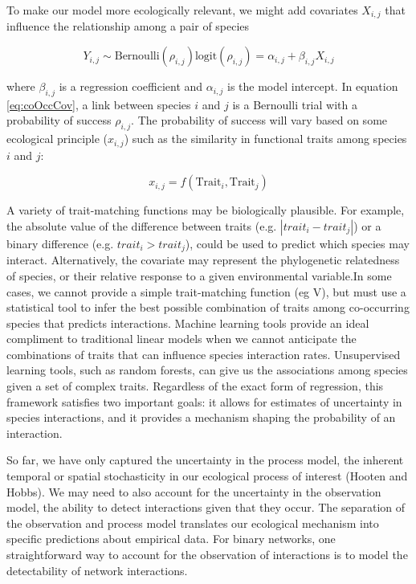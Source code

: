 To make our model more ecologically relevant, we might add covariates $X_{i,j}$
that influence the relationship among a pair of species

\begin{equation}
  \label{eq:coOccCov}
  Y_{i,j} \sim \text{Bernoulli}(\rho_{i,j})
  \text{logit}(\rho_{i,j}) = \alpha_{i,j}+\beta_{i,j}X_{i,j}
\end{equation}

where $\beta_{i,j}$ is a regression coefficient and $\alpha_{i,j}$ is the model
intercept. In equation \ref{eq:coOccCov}, a link between species $i$ and $j$ is
a Bernoulli trial with a probability of success $\rho_{i,j}$. The probability of
success will vary based on some ecological principle ($x_{i,j}$) such as the
similarity in functional traits among species $i$ and $j$:

\begin{equation}
  \label{eq:coOccTrait}
  x_{i,j}= f(\text{Trait}_i,\text{Trait}_j)
\end{equation}


A variety of trait-matching functions may be biologically plausible. For
example, the absolute value of the difference between traits (e.g. \(|trait_i -
trait_j|\)) or a binary difference (e.g. \(trait_i > trait_j\)), could be used
to predict which species may interact. Alternatively, the covariate may
represent the phylogenetic relatedness of species, or their relative response to
a given environmental variable.In some cases, we cannot provide a simple
trait-matching function (eg V), but must use a statistical tool to infer the
best possible combination of traits among co-occurring species that predicts
interactions. Machine learning tools provide an ideal compliment to traditional
linear models when we cannot anticipate the combinations of traits that can
influence species interaction rates. Unsupervised learning tools, such as random
forests, can give us the associations among species given a set of complex
traits. Regardless of the exact form of regression, this framework satisfies two
important goals: it allows for estimates of uncertainty in species interactions,
and it provides a mechanism shaping the probability of an interaction.

So far, we have only captured the uncertainty in the process model, the inherent
temporal or spatial stochasticity in our ecological process of interest (Hooten
and Hobbs). We may need to also account for the uncertainty in the observation
model, the ability to detect interactions given that they occur. The separation
of the observation and process model translates our ecological mechanism into
specific predictions about empirical data. For binary networks, one
straightforward way to account for the observation of interactions is to model
the detectability of network interactions.

